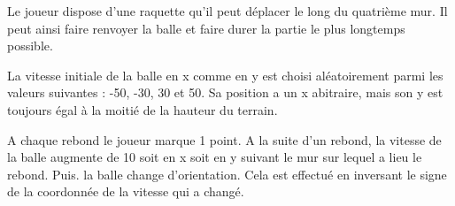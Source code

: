 \documentclass[12pt]{article}
\begin{document}
Le joueur dispose d'une raquette qu'il peut déplacer le long du quatrième mur.
Il peut ainsi faire renvoyer la balle et faire durer la partie le plus longtemps possible.

La vitesse initiale de la balle en x comme en y est choisi aléatoirement parmi les valeurs suivantes : -50, -30, 30 et 50.
Sa position a un x abitraire, mais son y est toujours égal à la moitié de la hauteur du terrain.

A chaque rebond le joueur marque 1 point.
A la suite d'un rebond, la vitesse de la balle augmente de 10 soit en x soit en y suivant le mur sur lequel a lieu le rebond.
Puis. la balle change d'orientation. 
Cela est effectué en inversant le signe de la coordonnée de la vitesse qui a changé.
\end{document}
